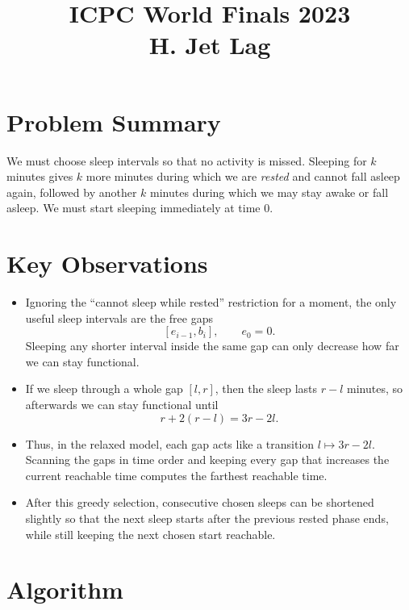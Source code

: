 \documentclass[11pt]{article}
\title{ICPC World Finals 2023\\H. Jet Lag}
\author{}
\date{}
\begin{document}
\maketitle

\section*{Problem Summary}

We must choose sleep intervals so that no activity is missed. Sleeping for $k$ minutes gives $k$ more
minutes during which we are \emph{rested} and cannot fall asleep again, followed by another $k$ minutes
during which we may stay awake or fall asleep. We must start sleeping immediately at time $0$.

\section*{Key Observations}

\begin{itemize}[leftmargin=*]
    \item Ignoring the ``cannot sleep while rested'' restriction for a moment, the only useful sleep intervals
    are the free gaps
    \[
    [e_{i-1}, b_i], \qquad e_0 = 0.
    \]
    Sleeping any shorter interval inside the same gap can only decrease how far we can stay functional.
    \item If we sleep through a whole gap $[l,r]$, then the sleep lasts $r-l$ minutes, so afterwards we can
    stay functional until
    \[
    r + 2(r-l) = 3r - 2l.
    \]
    \item Thus, in the relaxed model, each gap acts like a transition $l \mapsto 3r-2l$. Scanning the gaps
    in time order and keeping every gap that increases the current reachable time computes the farthest
    reachable time.
    \item After this greedy selection, consecutive chosen sleeps can be shortened slightly so that the next
    sleep starts after the previous rested phase ends, while still keeping the next chosen start reachable.
\end{itemize}

\section*{Algorithm}
\end{document}
